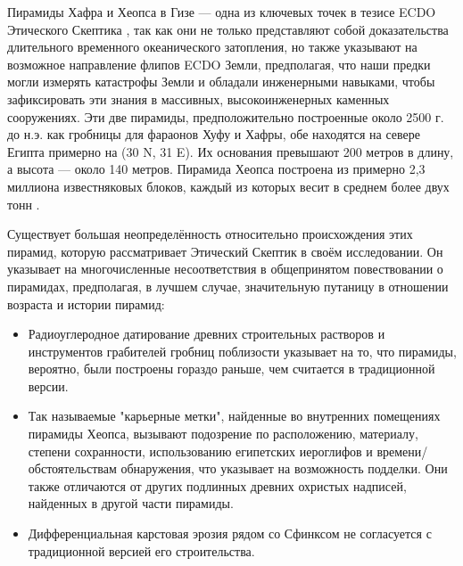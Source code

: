 \documentclass[10pt,twocolumn,letterpaper]{article}
\begin{document}
Пирамиды Хафра и Хеопса в Гизе — одна из ключевых точек в тезисе ECDO Этического Скептика \cite{27}, так как они не только представляют собой доказательства длительного временного океанического затопления, но также указывают на возможное направление флипов ECDO Земли, предполагая, что наши предки могли измерять катастрофы Земли и обладали инженерными навыками, чтобы зафиксировать эти знания в массивных, высокоинженерных каменных сооружениях. Эти две пирамиды, предположительно построенные около 2500 г. до н.э. как гробницы для фараонов Хуфу и Хафры, обе находятся на севере Египта примерно на (30 N, 31 E). Их основания превышают 200 метров в длину, а высота — около 140 метров. Пирамида Хеопса построена из примерно 2,3 миллиона известняковых блоков, каждый из которых весит в среднем более двух тонн \cite{24, 25}.

Существует большая неопределённость относительно происхождения этих пирамид, которую рассматривает Этический Скептик в своём исследовании. Он указывает на многочисленные несоответствия в общепринятом повествовании о пирамидах, предполагая, в лучшем случае, значительную путаницу в отношении возраста и истории пирамид:

\begin{flushleft}
\begin{itemize}
    \item Радиоуглеродное датирование древних строительных растворов и инструментов грабителей гробниц поблизости указывает на то, что пирамиды, вероятно, были построены гораздо раньше, чем считается в традиционной версии.
    \item Так называемые "карьерные метки", найденные во внутренних помещениях пирамиды Хеопса, вызывают подозрение по расположению, материалу, степени сохранности, использованию египетских иероглифов и времени/обстоятельствам обнаружения, что указывает на возможность подделки. Они также отличаются от других подлинных древних охристых надписей, найденных в другой части пирамиды.
    \item Дифференциальная карстовая эрозия рядом со Сфинксом не согласуется с традиционной версией его строительства.
\end{itemize}
\end{flushleft}
\end{document}
